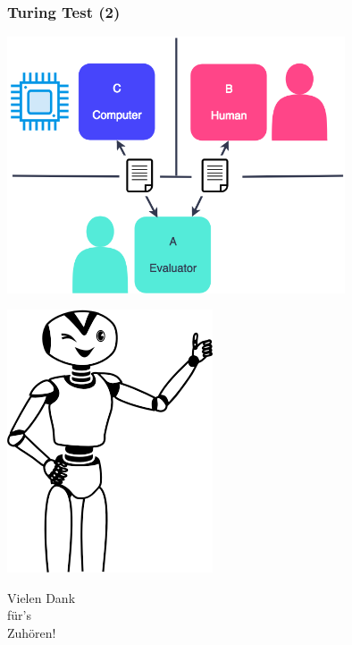 \documentclass[aspectratio=43,x11names]{beamer}
\begin{document}
\begin{frame}[fragile]
\frametitle{Turing Test (2)}

\begin{center}
\includegraphics[width=0.75\textwidth, keepaspectratio]{images/turingTest} 
\end{center}
\end{frame}



\begin{frame}[fragile]
\begin{multicols}{2}

\vspace*{73pt}
\includegraphics[scale=0.6]{images/Happy-Thumbs-Up-Robot.png} 

\columnbreak

\vspace*{40pt}

\Huge
\hspace*{-30pt}Vielen Dank\\ für's\\ Zuhören!
\end{multicols}
\end{frame}
\end{document}
